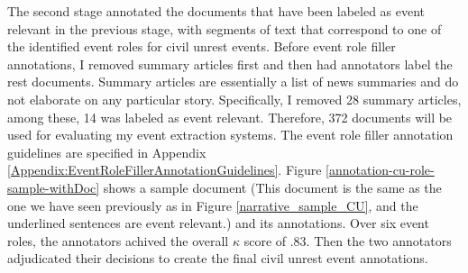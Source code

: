 The second stage annotated the documents that have been 
labeled as event relevant in the previous stage, with segments of text 
that correspond to one of the identified event roles for civil unrest events.
Before event role filler annotations, I 
removed summary articles first and then had annotators 
label the rest documents. 
Summary articles are essentially 
a list of news summaries and do not elaborate on 
any particular story.
Specifically, I removed 28 summary articles, among these, 
14 was labeled as event relevant.
Therefore, 372 documents will be used for evaluating my event extraction systems.
The event role filler annotation guidelines are specified in 
Appendix \ref{Appendix:EventRoleFillerAnnotationGuidelines}.
Figure \ref{annotation-cu-role-sample-withDoc} shows 
a sample document (This document is the same as the one 
we have seen previously as in Figure \ref{narrative_sample_CU}, 
and the underlined sentences are event relevant.) 
and its annotations. 
Over six event roles, the annotators achived the overall $\kappa$ score of .83.
Then the two annotators adjudicated their decisions to create  
the final civil unrest event annotations.










